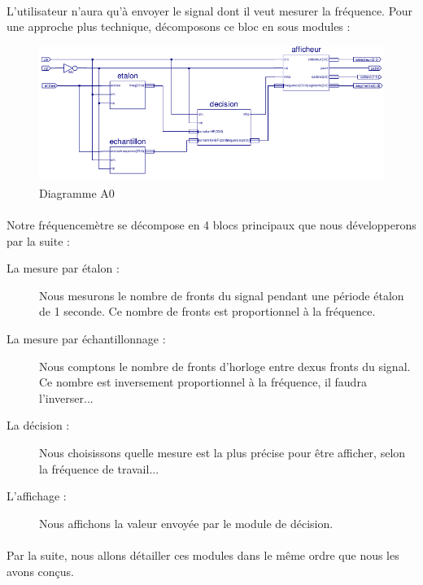 \documentclass[a4paper,11pt]{article}
\begin{document}
\paragraph{} L'utilisateur n'aura qu'à envoyer le signal dont il veut mesurer la fréquence. Pour une approche plus technique, décomposons
ce bloc en sous modules :

\begin{figure}[H]
\begin{center}
	\includegraphics[scale=.9]{sch-frequencemetre.png}
	\caption{Diagramme A0}
\end{center}
\end{figure}

\paragraph{} Notre fréquencemètre se décompose en 4 blocs principaux que nous développerons par la suite : 
\begin{description}
  \item[La mesure par étalon : ] Nous mesurons le nombre de fronts du signal pendant une période étalon de 1 seconde. Ce nombre de fronts est
  proportionnel à la fréquence.
  \item[La mesure par échantillonnage : ] Nous comptons le nombre de fronts d'horloge entre dexus fronts du signal. Ce nombre est
  inversement proportionnel à la fréquence, il faudra l'inverser...
  \item[La décision : ] Nous choisissons quelle mesure est la plus précise pour être afficher, selon la fréquence de travail...
  \item[L'affichage : ] Nous affichons la valeur envoyée par le module de décision.
\end{description}

\paragraph{} Par la suite, nous allons détailler ces modules dans le même ordre que nous les avons conçus.
\end{document}
